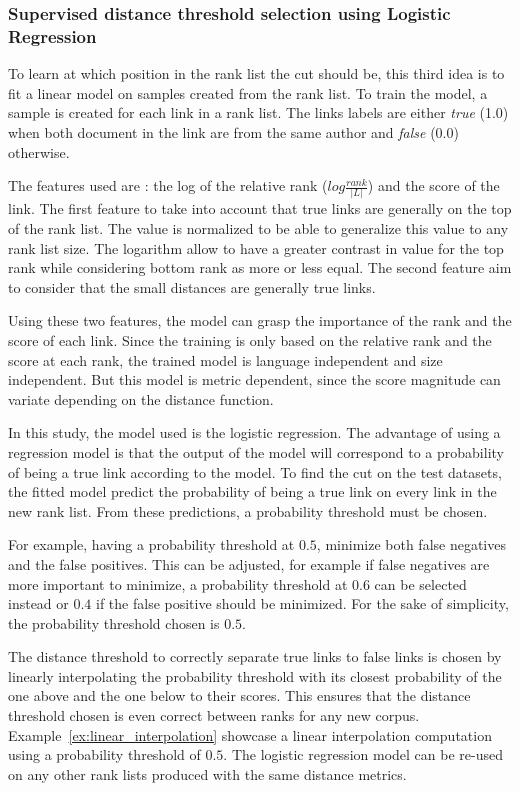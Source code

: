 \subsubsection{Supervised distance threshold selection using Logistic Regression}

To learn at which position in the rank list the cut should be, this third idea is to fit a linear model on samples created from the rank list.
To train the model, a sample is created for each link in a rank list.
The links labels are either \textit{true} (1.0) when both document in the link are from the same author and \textit{false} (0.0) otherwise.

The features used are : the log of the relative rank ($log \frac{rank}{|L|}$) and the score of the link.
The first feature to take into account that true links are generally on the top of the rank list.
The value is normalized to be able to generalize this value to any rank list size.
The logarithm allow to have a greater contrast in value for the top rank while considering bottom rank as more or less equal.
The second feature aim to consider that the small distances are generally true links.

Using these two features, the model can grasp the importance of the rank and the score of each link.
Since the training is only based on the relative rank and the score at each rank, the trained model is language independent and size independent.
But this model is metric dependent, since the score magnitude can variate depending on the distance function.

In this study, the model used is the logistic regression.
The advantage of using a regression model is that the output of the model will correspond to a probability of being a true link according to the model.
To find the cut on the test datasets, the fitted model predict the probability of being a true link on every link in the new rank list.
From these predictions, a probability threshold must be chosen.

For example, having a probability threshold at $0.5$, minimize both false negatives and the false positives.
This can be adjusted, for example if false negatives are more important to minimize, a probability threshold at $0.6$ can be selected instead or $0.4$ if the false positive should be minimized.
For the sake of simplicity, the probability threshold chosen is $0.5$.

The distance threshold to correctly separate true links to false links is chosen by linearly interpolating the probability threshold with its closest probability of the one above and the one below to their scores.
This ensures that the distance threshold chosen is even correct between ranks for any new corpus.
Example~\ref{ex:linear_interpolation} showcase a linear interpolation computation using a probability threshold of $0.5$.
The logistic regression model can be re-used on any other rank lists produced with the same distance metrics.

